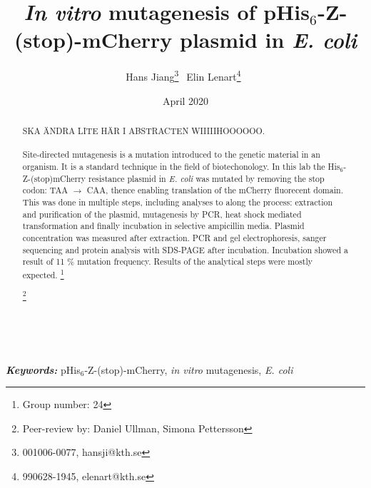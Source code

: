\documentclass[11pt,a4paper]{article}
\title{\textit{In vitro} mutagenesis of pHis$_6$-Z-(stop)-mCherry plasmid in \textit{E. coli}}
\author{Hans Jiang\thanks{001006-0077, hansji@kth.se} $\: \:$Elin Lenart\thanks{990628-1945, elenart@kth.se}$\: \:$}
\date{April 2020}
\providecommand{\keywords}[1]{\textbf{\textit{Keywords:}} #1}
\newcommand\blfootnote[1]{%
  \begingroup
  \renewcommand\thefootnote{}\footnote{#1}%
  \addtocounter{footnote}{-1}%
  \endgroup
}
\begin{document}
\maketitle
{}

\begin{abstract}
SKA ÄNDRA LITE HÄR I ABSTRACTEN WIIIIIHOOOOOO. \\ \\ Site-directed mutagenesis is a mutation introduced to the genetic material in an organism. It is a standard technique in the field of biotechonology. In this lab the His$_6$-Z-(stop)mCherry resistance plasmid in \textit{E. coli} was mutated by removing the stop codon: TAA $\rightarrow$ CAA, thence enabling translation of the mCherry fluorecent domain. This was done in multiple steps, including analyses to along the process: extraction and purification of the plasmid, mutagenesis by PCR, heat shock mediated transformation and finally incubation in selective ampicillin media. Plasmid concentration was measured after extraction. PCR and gel electrophoresis, sanger sequencing and protein analysis with SDS-PAGE after incubation. Incubation showed a result of 11 \% mutation frequency. Results of the analytical steps were mostly expected. \blfootnote{Group number: 24} \blfootnote{Peer-review by: Daniel Ullman, Simona Pettersson} \\

\end{abstract}
\keywords{pHis$_6$-Z-(stop)-mCherry, \textit{in vitro} mutagenesis, \textit{E. coli}}
\pagebreak
\tableofcontents \pagebreak
\end{document}
